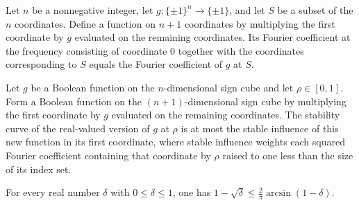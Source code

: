 \begin{theorem}
\label{FABL.fourierCoeff_leadingCoordinateTimes_insert_zero_tailFrequency}
\leanok
{}
Let $n$ be a nonnegative integer, let $g:\{\pm1\}^n\to\{\pm1\}$, and let $S$ be a subset
of the $n$ coordinates. Define a function on $n+1$ coordinates by multiplying the first
coordinate by $g$ evaluated on the remaining coordinates. Its Fourier coefficient at the
frequency consisting of coordinate $0$ together with the coordinates corresponding to
$S$ equals the Fourier coefficient of $g$ at $S$.
\end{theorem}

\begin{theorem}
\label{FABL.stabilityCurve_le_stableInfluence_leadingCoordinateTimes}
\leanok
{}
Let $g$ be a Boolean function on the $n$-dimensional sign cube and let $\rho\in[0,1]$.
Form a Boolean function on the $(n+1)$-dimensional sign cube by multiplying the first
coordinate by $g$ evaluated on the remaining coordinates. The stability curve of the
real-valued version of $g$ at $\rho$ is at most the stable influence of this new
function in its first coordinate, where stable influence weights each squared Fourier
coefficient containing that coordinate by $\rho$ raised to one less than the size of its
index set.
\end{theorem}

\begin{theorem}
\label{FABL.one_sub_sqrt_le_two_div_pi_mul_arcsin_one_sub}
\leanok
{}
For every real number $\delta$ with $0\leq\delta\leq 1$, one has $1-\sqrt{\delta}\leq
\frac{2}{\pi}\arcsin(1-\delta)$.
\end{theorem}

